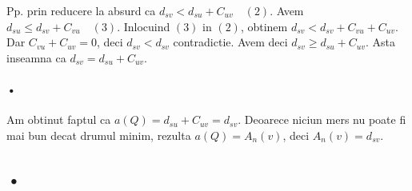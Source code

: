 \documentclass[paper=a4, fontsize=11pt]{scrartcl}
\begin{document}




Pp. prin reducere la absurd ca $d_{sv} < d_{su} + C_{uv} \quad (2)$. Avem $d_{su} \leqslant d_{sv} + C_{vu} \quad (3)$. Inlocuind $(3)$ in $(2)$, obtinem $d_{sv} < d_{sv} + C_{vu} + C_{uv}$. Dar $C_{vu} + C_{uv} = 0$, deci $d_{sv} <d_{sv}$ contradictie. Avem deci $d_{sv} \geqslant d_{su} + C_{uv}$. Asta inseamna ca $d_{sv} = d_{su} + C_{uv}$.

\paragraph{•}
Am obtinut faptul ca $a(Q) = d_{su} + C_{uv} = d_{sv}$. Deoarece niciun mers nu poate fi mai bun decat drumul minim, rezulta $a(Q)=A_n(v)$, deci $A_n(v)=d_{sv}$.


\subsection{•}
\end{document}

